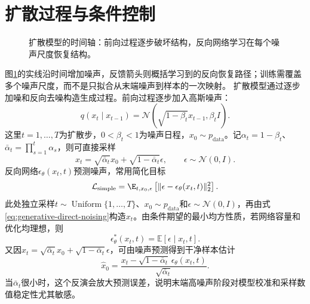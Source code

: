 \section{扩散过程与条件控制}
\begin{figure}[htbp]
\centering
{}
\caption{扩散模型的时间轴：前向过程逐步破坏结构，反向网络学习在每个噪声尺度恢复结构。}
\label{fig:generative-diffusion-time}
\end{figure}
图\ref{fig:generative-diffusion-time}的实线沿时间增加噪声，反馈箭头则概括学习到的反向恢复路径；训练需覆盖多个噪声尺度，而不是只拟合从末端噪声到样本的一次映射。
扩散模型通过逐步加噪和反向去噪构造生成过程\cite{ho2020ddpm}。前向过程逐步加入高斯噪声：
\begin{equation}
 q(x_t\mid x_{t-1})=\mathcal{N}(\sqrt{1-\beta_t}x_{t-1},\beta_tI).
\end{equation}
这里$t=1,\ldots,T$为扩散步，$0<\beta_t<1$为噪声日程，$x_0\sim p_{\mathrm{data}}$。记$\alpha_t=1-\beta_t$、$\bar\alpha_t=\prod_{s=1}^{t}\alpha_s$，则可直接采样
\begin{equation}
 x_t=\sqrt{\bar\alpha_t}x_0+\sqrt{1-\bar\alpha_t}\epsilon,
 \qquad \epsilon\sim\mathcal{N}(0,I).\label{eq:generative-direct-noising}
\end{equation}
反向网络$\epsilon_\theta(x_t,t)$预测噪声，常用简化目标
\begin{equation}
 \mathcal{L}_{\mathrm{simple}}=\E_{t,x_0,\epsilon}\left[\|\epsilon-\epsilon_\theta(x_t,t)\|_2^2\right].
\end{equation}
此处独立采样$t\sim\operatorname{Uniform}\{1,\ldots,T\}$、$x_0\sim p_{\mathrm{data}}$和$\epsilon\sim\mathcal N(0,I)$，再由式\eqref{eq:generative-direct-noising}构造$x_t$。由条件期望的最小均方性质，若网络容量和优化均理想，则
\[
\epsilon_\theta^*(x_t,t)=\mathbb E[\epsilon\mid x_t,t].
\]
又因$x_t=\sqrt{\bar\alpha_t}x_0+\sqrt{1-\bar\alpha_t}\epsilon$，可由噪声预测得到干净样本估计
\[
\widehat x_0=\frac{x_t-\sqrt{1-\bar\alpha_t}\,\epsilon_\theta(x_t,t)}{\sqrt{\bar\alpha_t}}.
\]
当$\bar\alpha_t$很小时，这个反演会放大预测误差，说明末端高噪声阶段对模型校准和采样数值稳定性尤其敏感。

